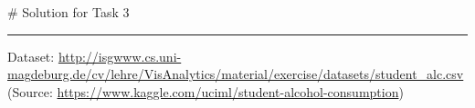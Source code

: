 \documentclass[11pt,]{article}
\newenvironment{Shaded}{}{}
\newcommand{\CommentTok}[1]{\textcolor[rgb]{0.00,0.50,0.00}{#1}}
\begin{document}
\begin{Shaded}
\begin{Highlighting}[]
\CommentTok{# Solution for Task 3}
\end{Highlighting}
\end{Shaded}

\begin{center}\rule{0.5\linewidth}{0.5pt}\end{center}

Dataset:
\url{http://isgwww.cs.uni-magdeburg.de/cv/lehre/VisAnalytics/material/exercise/datasets/student_alc.csv}\\
(Source: \url{https://www.kaggle.com/uciml/student-alcohol-consumption})
\end{document}
